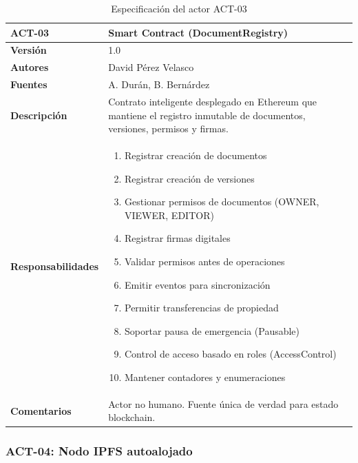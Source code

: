 \documentclass[11pt, a4paper]{article}
\begin{document}
\begin{table}[H]
    \centering
    \small
    \begin{tabular}{|p{4cm}|p{10cm}|}
    \hline
    \textbf{ACT-03} & Smart Contract (DocumentRegistry) \\
    \hline
    \textbf{Versión} & 1.0 \\
    \hline
    \textbf{Autores} & David Pérez Velasco \\
    \hline
    \textbf{Fuentes} & A. Durán, B. Bernárdez \\
    \hline
    \textbf{Descripción} & Contrato inteligente desplegado en Ethereum que mantiene el registro inmutable de documentos, versiones, permisos y firmas. \\
    \hline
    \textbf{Responsabilidades} & 
    \begin{enumerate}
        \item Registrar creación de documentos
        \item Registrar creación de versiones
        \item Gestionar permisos de documentos (OWNER, VIEWER, EDITOR)
        \item Registrar firmas digitales
        \item Validar permisos antes de operaciones
        \item Emitir eventos para sincronización
        \item Permitir transferencias de propiedad
        \item Soportar pausa de emergencia (Pausable)
        \item Control de acceso basado en roles (AccessControl)
        \item Mantener contadores y enumeraciones
    \end{enumerate} \\
    \hline
    \textbf{Comentarios} & Actor no humano. Fuente única de verdad para estado blockchain. \\
    \hline
    \end{tabular}
    \caption{Especificación del actor ACT-03}
\end{table}

\subsubsection{ACT-04: Nodo IPFS autoalojado}
\end{document}
